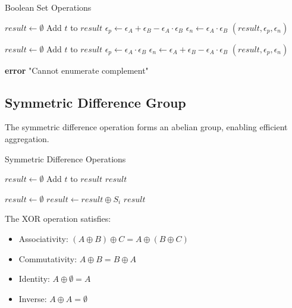 \documentclass[../main_comprehensive.tex]{subfiles}
\begin{document}
\begin{algorithm}
\caption{Boolean Set Operations}
\label{alg:bool_ops}
\begin{algorithmic}[1]
  \STATE $result \leftarrow \emptyset$
    \STATE Add $t$ to $result$
  \ENDFOR
  \STATE $\epsilon_p \leftarrow \epsilon_A + \epsilon_B - \epsilon_A \cdot \epsilon_B$
  \STATE $\epsilon_n \leftarrow \epsilon_A \cdot \epsilon_B$
  \RETURN $(result, \epsilon_p, \epsilon_n)$
\ENDPROCEDURE

  \STATE $result \leftarrow \emptyset$
      \STATE Add $t$ to $result$
    \ENDIF
  \ENDFOR
  \STATE $\epsilon_p \leftarrow \epsilon_A \cdot \epsilon_B$
  \STATE $\epsilon_n \leftarrow \epsilon_A + \epsilon_B - \epsilon_A \cdot \epsilon_B$
  \RETURN $(result, \epsilon_p, \epsilon_n)$
\ENDPROCEDURE

  \STATE \textbf{error} "Cannot enumerate complement"
  \STATE {}
\ENDPROCEDURE
\end{algorithmic}
\end{algorithm}

\subsection{Symmetric Difference Group}

The symmetric difference operation forms an abelian group, enabling efficient aggregation.

\begin{algorithm}
\caption{Symmetric Difference Operations}
\label{alg:sym_diff}
\begin{algorithmic}[1]
  \STATE $result \leftarrow \emptyset$
      \STATE Add $t$ to $result$
    \ENDIF
  \ENDFOR
  \RETURN $result$
\ENDPROCEDURE

  \STATE $result \leftarrow \emptyset$
    \STATE $result \leftarrow result \oplus S_i$
  \ENDFOR
  \RETURN $result$
\ENDPROCEDURE
\end{algorithmic}
\end{algorithm}

The XOR operation satisfies:
\begin{itemize}
\item Associativity: $(A \oplus B) \oplus C = A \oplus (B \oplus C)$
\item Commutativity: $A \oplus B = B \oplus A$
\item Identity: $A \oplus \emptyset = A$
\item Inverse: $A \oplus A = \emptyset$
\end{itemize}
\end{document}

